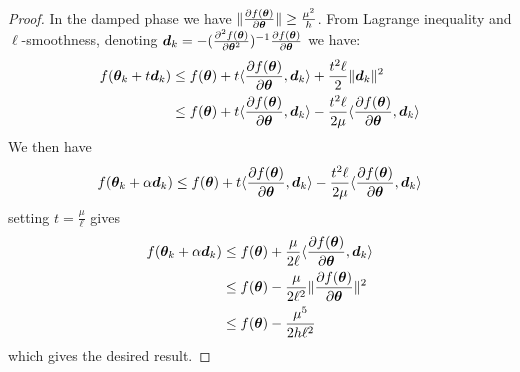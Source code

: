  \begin{proof}
   In the damped phase we have  $\| \partialfrac{\thetab}{f(\thetab)} \| \geq
   \frac{\mu^2}{h}$.
   From Lagrange inequality and $\ell$-smoothness, denoting $\db_k = -(\partialfrac{\thetab^2}{^2 f(\thetab)})^{-1} \partialfrac{\thetab}{f(\thetab)}$ we have:
   \begin{align}
     f(\thetab_k + t \db_k) & \leq f(\thetab) + t \dotp{ \partialfrac{\thetab}{f(\thetab)} }{ \db_k }  +  \frac{t^2 \ell}{2} \|\db_k\|^2 \\
                        & \leq f(\thetab) + t \dotp{ \partialfrac{\thetab}{f(\thetab)} }{ \db_k }  -  \frac{t^2 \ell}{2 \mu} \dotp{ \partialfrac{\thetab}{f(\thetab)} }{ \db_k } \\
   \end{align}
   We then have 
   \begin{align}
     &  f(\thetab_k + \alpha \db_k)  \leq f(\thetab) + t \dotp{ \partialfrac{\thetab}{f(\thetab)} }{ \db_k }  -  \frac{t^2 \ell}{2 \mu} \dotp{ \partialfrac{\thetab}{f(\thetab)} }{ \db_k } \\
   \end{align}
   setting $t = \frac{\mu}{\ell}$ gives
   \begin{align}
       f(\thetab_k +\alpha \db_k)  &\leq f(\thetab) + \frac{\mu}{2\ell} \dotp{ \partialfrac{\thetab}{f(\thetab)} }{ \db_k }  \\
     &\leq f(\thetab) - \frac{\mu}{2\ell^2} \|\partialfrac{\thetab}{f(\thetab)}\|^2  \\
     &\leq f(\thetab) - \frac{\mu^5}{2h \ell^2} \\
   \end{align}
   which gives the desired result.


\end{proof}
